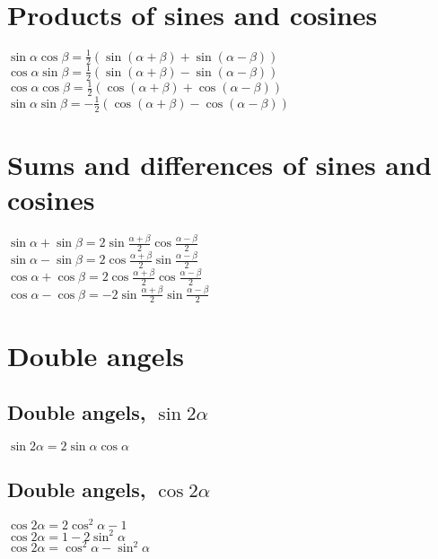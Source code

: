 \documentclass[a4paper, 10pt]{scrartcl}
\begin{document}
\section*{Products of sines and cosines}
$\sin{\alpha}\cos{\beta} = \frac{1}{2}(\sin{(\alpha + \beta)} + \sin{(\alpha - \beta)})$\\
$\cos{\alpha}\sin{\beta} = \frac{1}{2}(\sin{(\alpha + \beta)} - \sin{(\alpha - \beta)})$\\
$\cos{\alpha}\cos{\beta} = \frac{1}{2}(\cos{(\alpha + \beta)} + \cos{(\alpha - \beta)})$\\
$\sin{\alpha}\sin{\beta} = -\frac{1}{2}(\cos{(\alpha + \beta)} - \cos{(\alpha - \beta)})$\\

\section*{Sums and differences of sines and cosines}
$\sin{\alpha} + \sin{\beta} = 2\sin{\frac{\alpha + \beta}{2}}\cos{\frac{\alpha - \beta}{2}}$\\
$\sin{\alpha} - \sin{\beta} = 2\cos{\frac{\alpha + \beta}{2}}\sin{\frac{\alpha - \beta}{2}}$\\
$\cos{\alpha} + \cos{\beta} = 2\cos{\frac{\alpha + \beta}{2}}\cos{\frac{\alpha - \beta}{2}}$\\
$\cos{\alpha} - \cos{\beta} = -2\sin{\frac{\alpha + \beta}{2}}\sin{\frac{\alpha - \beta}{2}}$\\

\section*{Double angels}

\subsection*{Double angels, $\sin{2\alpha}$}
$\sin{2\alpha} = 2\sin{\alpha}\cos{\alpha}$\\

\subsection*{Double angels, $\cos{2\alpha}$}
$\cos{2\alpha} = 2\cos^{2}{\alpha} - 1$\\
$\cos{2\alpha} = 1 - 2\sin^{2}{\alpha}$\\
$\cos{2\alpha} = \cos^{2}{\alpha} - \sin^{2}{\alpha}$\\
\end{document}
